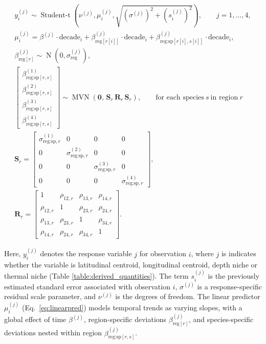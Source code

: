\documentclass[9pt,twocolumn,twoside]{pnas-new}
\begin{document}
{\begin{gather}
y_{i}^{(j)} \sim \operatorname{Student\text{-}t}
\left(\nu^{(j)}, 
\mu_{i}^{(j)}, 
\sqrt{(\sigma^{(j)})^{2} + (s^{(j)}_{i})^{2}}
\right),
\qquad j=1,\dots,4, 
\\
\mu_{i}^{(j)} =
\beta^{(j)} \cdot \text{decade}_{i}
+ \beta_{\text{reg}[r[i]]}^{(j)} \cdot \text{decade}_{i}
+ \beta_{\text{reg:sp}[r[i],s[i]]}^{(j)} \cdot \text{decade}_{i}\label{eq:linearpred},
\\
\beta_{\text{reg}[r]}^{(j)} \sim 
\operatorname{N}\!\left(0,\sigma_{\text{reg}}^{(j)}\right),
\\
\begin{bmatrix}
\beta_{\text{reg:sp}[r,s]}^{(1)} \\
\beta_{\text{reg:sp}[r,s]}^{(2)} \\
\beta_{\text{reg:sp}[r,s]}^{(3)} \\
\beta_{\text{reg:sp}[r,s]}^{(4)}
\end{bmatrix}
\sim 
\operatorname{MVN}\!\left(
\mathbf{0},\,
\mathbf{S}_{r}\,\mathbf{R}_{r}\,\mathbf{S}_{r}
\right),
\qquad \text{for each species}~s~\text{in region}~r
\\
\mathbf{S}_{r} =
\begin{bmatrix}
\sigma^{(1)}_{\text{reg:sp},r} & 0 & 0 & 0 \\
0 & \sigma^{(2)}_{\text{reg:sp},r} & 0 & 0 \\
0 & 0 & \sigma^{(3)}_{\text{reg:sp},r} & 0 \\
0 & 0 & 0 & \sigma^{(4)}_{\text{reg:sp},r}
\end{bmatrix},
\\
\mathbf{R}_{r} =
\begin{bmatrix}
1 & \rho_{12,r} & \rho_{13,r} & \rho_{14,r} \\
\rho_{12,r} & 1 & \rho_{23,r} & \rho_{24,r} \\
\rho_{13,r} & \rho_{23,r} & 1 & \rho_{34,r} \\
\rho_{14,r} & \rho_{24,r} & \rho_{34,r} & 1
\end{bmatrix}.
\end{gather}


\noindent Here, $y^{(j)}_i$ denotes the response variable $j$ for observation $i$, where $j$ is indicates whether the variable is latitudinal centroid,
longitudinal centroid, depth niche or thermal niche (Table \ref{table:derived_quantities}). The term $s^{(j)}_i$ is the previously estimated standard error associated with observation $i$, $\sigma^{(j)}$ is a response-specific residual scale parameter, and $\nu^{(j)}$ is the degrees of freedom. The linear predictor $\mu^{(j)}_i$ (Eq.~\ref{eq:linearpred}) models temporal trends as varying slopes, with a global effect of time $\beta^{(j)}$, region-specific deviations $\beta^{(j)}_{\text{reg}[r]}$, and species-specific deviations nested within region $\beta^{(j)}_{\text{reg:sp}[r,s]}$. 

}
\end{document}
